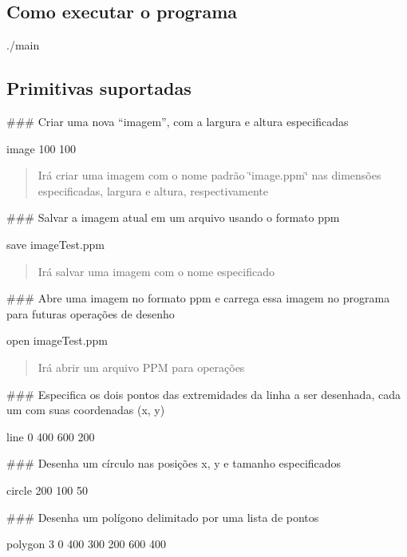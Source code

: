 \subsection*{Como executar o programa}


\begin{DoxyCode}
./main
\end{DoxyCode}


\subsection*{Primitivas suportadas}

\#\#\# Criar uma nova “imagem”, com a largura e altura especificadas 
\begin{DoxyCode}
image 100 100
\end{DoxyCode}
 \begin{quote}
Irá criar uma imagem com o nome padrão \char`\"{}image.\+ppm\char`\"{} nas dimensões especificadas, largura e altura, respectivamente \end{quote}


\#\#\# Salvar a imagem atual em um arquivo usando o formato ppm 
\begin{DoxyCode}
save imageTest.ppm
\end{DoxyCode}
 \begin{quote}
Irá salvar uma imagem com o nome especificado \end{quote}


\#\#\# Abre uma imagem no formato ppm e carrega essa imagem no programa para futuras operações de desenho 
\begin{DoxyCode}
open imageTest.ppm
\end{DoxyCode}
 \begin{quote}
Irá abrir um arquivo P\+PM para operações \end{quote}


\#\#\# Especifica os dois pontos das extremidades da linha a ser desenhada, cada um com suas coordenadas (x, y) 
\begin{DoxyCode}
line 0 400 600 200
\end{DoxyCode}


\#\#\# Desenha um círculo nas posições x, y e tamanho especificados 
\begin{DoxyCode}
circle 200 100 50
\end{DoxyCode}


\#\#\# Desenha um polígono delimitado por uma lista de pontos 
\begin{DoxyCode}
polygon 3 0 400 300 200 600 400
\end{DoxyCode}


